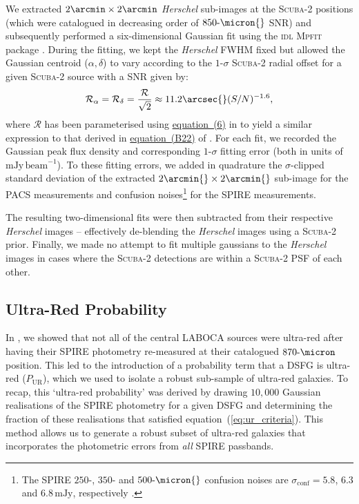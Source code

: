 \documentclass[a4paper, fleqn, usenatbib]{mnras}
\newcommand{\herschel}{\textit{Herschel}}
\newcommand{\millijanksy}{\text{mJy}}
\newcommand{\pur}{P_{\text{UR}}}
\newcommand{\scuba}{\mbox{\textsc{Scuba}-2}}
\newcommand{\urgs}{ultra-red galaxies}
\begin{document}
We extracted $2\arcmin\times2\arcmin$ \herschel{} sub-images at the \scuba{} positions (which were catalogued in decreasing order of $850\text{-}\micron{}$ SNR) and subsequently performed a six-dimensional Gaussian fit using the \textsc{idl} \textsc{Mpfit} package \citep{markwardt09}.
During the fitting, we kept the \herschel{} FWHM fixed but allowed the Gaussian centroid ($\alpha,\delta$) to vary according to the $1\text{-}\sigma$ \scuba{} radial offset for a given \scuba{} source with a SNR given by:
\begin{equation}
    \label{eq:s2cls_radial_offset}
    \mathcal{R}_{\alpha} = \mathcal{R}_{\delta} = \frac{\mathcal{R}}{\sqrt{2}} \approx 11.2\arcsec{}(S/N)^{-1.6},
\end{equation}
\noindent
where $\mathcal{R}$ has been parameterised using \href{}{equation~(6)} in \citet{geach17} to yield a similar expression to that derived in \href{}{equation~(B22)} of \citet{ivison07}.
For each fit, we recorded the Gaussian peak flux density and corresponding $1\text{-}\sigma$ fitting error (both in units of $\millijanksy{}\,\text{beam}^{-1}$).
To these fitting errors, we added in quadrature the $\sigma$-clipped standard deviation of the extracted $2\arcmin{}\times2\arcmin{}$ sub-image for the PACS measurements and confusion noises\footnote{
  The SPIRE $250\text{-}$, $350\text{-}$ and $500\text{-}\micron{}$ confusion noises are $\sigma_{\text{conf}}=5.8$, $6.3$ and $6.8\,\millijanksy{}$, respectively \citep{nguyen10}.}
for the SPIRE measurements.

The resulting two-dimensional fits were then subtracted from their respective \herschel{} images -- effectively de-blending the \herschel{} images using a \scuba{} prior.
Finally, we made no attempt to fit multiple gaussians to the \herschel{} images in cases where the \scuba{} detections are within a \scuba{} PSF of each other.

\subsection{Ultra-Red Probability}

In , we showed that not all of the central LABOCA sources were ultra-red after having their SPIRE photometry re-measured at their catalogued $870\text{-}\micron$ position.
This led to the introduction of a probability term that a DSFG is ultra-red ($\pur{}$), which we used to isolate a robust sub-sample of \urgs{}.
To recap, this `ultra-red probability' was derived by drawing $10{,}000$ Gaussian realisations of the SPIRE photometry for a given DSFG and determining the fraction of these realisations that satisfied equation~(\ref{eq:ur_criteria}).
This method allows us to generate a robust subset of \urgs{} that incorporates the photometric errors from \emph{all} SPIRE passbands.
\end{document}
